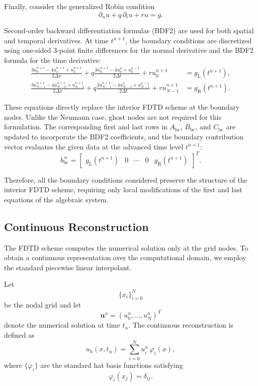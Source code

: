 \documentclass{Configuration_Files/PoliMi3i_thesis}
\begin{document}
Finally, consider the generalized Robin condition
\begin{equation*}
\partial_nu
+
q\,\partial_tu
+
ru
=
g.
\end{equation*}

Second-order backward differentiation formulas (BDF2) are used for both spatial and temporal derivatives. At time $t^{n+1}$, the boundary conditions are discretized using one-sided 3-point finite differences for the normal derivative and the BDF2 formula for the time derivative:
\begin{align*}
\frac{3u_{0}^{n+1}-4u_{1}^{n+1}+u_{2}^{n+1}}{2\Delta x}
+
q\frac{3u_0^{n+1}-4u_0^{n}+u_0^{n-1}}{2\Delta t}
+
ru_0^{n+1}
&=
g_{\mathrm L}(t^{n+1}),
\\
\frac{3u_{N-1}^{n+1}-4u_{N-2}^{n+1}+u_{N-3}^{n+1}}{2\Delta x}
+
q\frac{3u_{N-1}^{n+1}-4u_{N-1}^{n}+u_{N-1}^{n-1}}{2\Delta t}
+
ru_{N-1}^{n+1}
&=
g_{\mathrm R}(t^{n+1}).
\end{align*}

These equations directly replace the interior FDTD scheme at the boundary nodes. Unlike the Neumann case, ghost nodes are not required for this formulation. The corresponding first and last rows in $A_{\mathrm{bc}}$, $B_{\mathrm{bc}}$, and $C_{\mathrm{bc}}$ are updated to incorporate the BDF2 coefficients, and the boundary contribution vector evaluates the given data at the advanced time level $t^{n+1}$:
\begin{equation*}
b_{\mathrm{bc}}^{\,n}
=
\begin{bmatrix}
g_{\mathrm L}(t^{n+1})
&
0
&
\cdots
&
0
&
g_{\mathrm R}(t^{n+1})
\end{bmatrix}^{T}.
\end{equation*}

Therefore, all the boundary conditions considered preserve the structure of the interior FDTD scheme, requiring only local modifications of the first and last equations of the algebraic system.

\subsection{Continuous Reconstruction}

The FDTD scheme computes the numerical solution only at the grid nodes. To
obtain a continuous representation over the computational domain, we employ the
standard piecewise linear interpolant.

Let
\[
\{x_i\}_{i=0}^{N}
\]
be the nodal grid and let
\[
\mathbf u^n=(u_0^n,\ldots,u_N^n)^T
\]
denote the numerical solution at time $t_n$. The continuous reconstruction is
defined as
\begin{equation*}
u_h(x,t_n)
=
\sum_{i=0}^{N}
u_i^n\,\varphi_i(x),
\end{equation*}
where $\{\varphi_i\}$ are the standard hat basis functions satisfying
\[
\varphi_i(x_j)=\delta_{ij}.
\]
\end{document}
